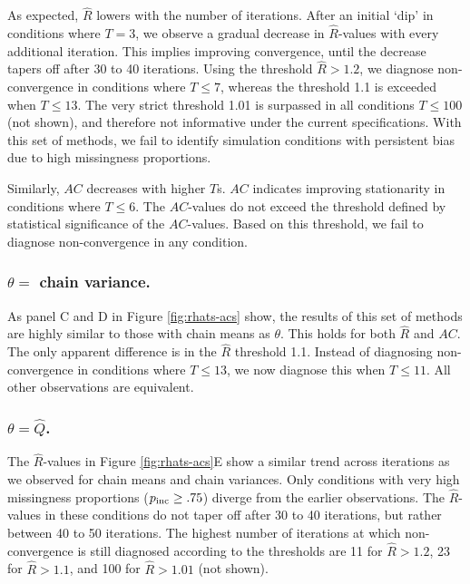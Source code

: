 \documentclass[Royal,times,sageh]{sagej}
\begin{document}
As expected, \(\widehat{R}\) lowers with the number of iterations. After an initial `dip' in conditions where \(T=3\), we observe a gradual decrease in \(\widehat{R}\)-values with every additional iteration. This implies improving convergence, until the decrease tapers off after 30 to 40 iterations. Using the threshold \(\widehat{R}>1.2\), we diagnose non-convergence in conditions where \(T\leq7\), whereas the threshold 1.1 is exceeded when \(T\leq13\). The very strict threshold 1.01 is surpassed in all conditions \(T\leq100\) (not shown), and therefore not informative under the current specifications. With this set of methods, we fail to identify simulation conditions with persistent bias due to high missingness proportions.

Similarly, \(AC\) decreases with higher \(T\)s. \(AC\) indicates improving stationarity in conditions where \(T\leq6\). The \(AC\)-values do not exceed the threshold defined by statistical significance of the \(AC\)-values. Based on this threshold, we fail to diagnose non-convergence in any condition.

\hypertarget{theta-chain-variance.}{%
\subsubsection{\texorpdfstring{\(\theta=\) chain variance.}{\textbackslash theta= chain variance.}}\label{theta-chain-variance.}}

As panel C and D in Figure \ref{fig:rhats-acs} show, the results of this set of methods are highly similar to those with chain means as \(\theta\). This holds for both \(\widehat{R}\) and \(AC\). The only apparent difference is in the \(\widehat{R}\) threshold 1.1. Instead of diagnosing non-convergence in conditions where \(T\leq13\), we now diagnose this when \(T\leq11\). All other observations are equivalent.

\hypertarget{thetahatq.}{%
\subsubsection{\texorpdfstring{\(\theta=\hat{Q}\).}{\textbackslash theta=\textbackslash hat\{Q\}.}}\label{thetahatq.}}

The \(\widehat{R}\)-values in Figure \ref{fig:rhats-acs}E show a similar trend across iterations as we observed for chain means and chain variances. Only conditions with very high missingness proportions (\(p_{\rm inc}\geq.75\)) diverge from the earlier observations. The \(\widehat{R}\)-values in these conditions do not taper off after 30 to 40 iterations, but rather between 40 to 50 iterations. The highest number of iterations at which non-convergence is still diagnosed according to the thresholds are 11 for \(\widehat{R}>1.2\), 23 for \(\widehat{R}>1.1\), and 100 for \(\widehat{R}>1.01\) (not shown).
\end{document}
